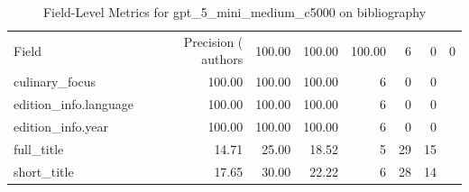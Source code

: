 \begin{table}
\caption{Field-Level Metrics for gpt_5_mini_medium_c5000 on bibliography}
\label{tab:fields_gpt_5_mini_medium_c5000_bibliography}
\begin{tabular}{lrrrrrr}
\toprule
Field & Precision (%
\midrule
authors & 100.00 & 100.00 & 100.00 & 6 & 0 & 0 \\
culinary_focus & 100.00 & 100.00 & 100.00 & 6 & 0 & 0 \\
edition_info.language & 100.00 & 100.00 & 100.00 & 6 & 0 & 0 \\
edition_info.year & 100.00 & 100.00 & 100.00 & 6 & 0 & 0 \\
full_title & 14.71 & 25.00 & 18.52 & 5 & 29 & 15 \\
short_title & 17.65 & 30.00 & 22.22 & 6 & 28 & 14 \\
\bottomrule
\end{tabular}
\end{table}
